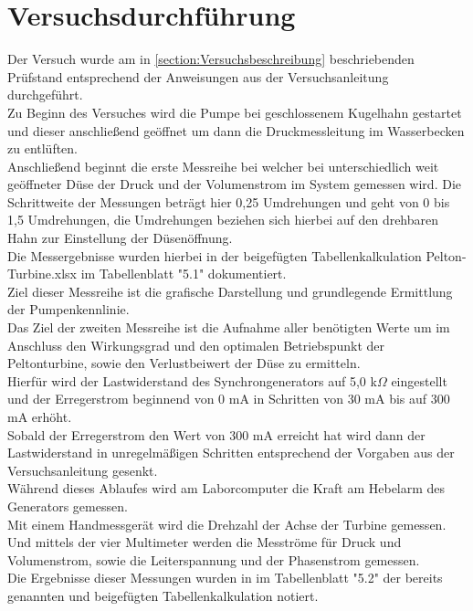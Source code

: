 \section{Versuchsdurchführung}
Der Versuch wurde am in \autoref{section:Versuchsbeschreibung} beschriebenden Prüfstand entsprechend der Anweisungen aus der Versuchsanleitung \cite[S.11-14]{Anleitung} durchgeführt.\\
Zu Beginn des Versuches wird die Pumpe bei geschlossenem Kugelhahn gestartet und dieser anschließend geöffnet um dann die Druckmessleitung im Wasserbecken zu entlüften.\\
Anschließend beginnt die erste Messreihe bei welcher bei unterschiedlich weit geöffneter Düse der Druck und der Volumenstrom im System gemessen wird.
Die Schrittweite der Messungen beträgt hier 0,25 Umdrehungen und geht von 0 bis 1,5 Umdrehungen, die Umdrehungen beziehen sich hierbei auf den drehbaren Hahn zur Einstellung der Düsenöffnung.\\
Die Messergebnisse wurden hierbei in der beigefügten Tabellenkalkulation Pelton-Turbine.xlsx im Tabellenblatt "5.1" dokumentiert.\\
Ziel dieser Messreihe ist die grafische Darstellung und grundlegende Ermittlung der Pumpenkennlinie.\\
\newline
Das Ziel der zweiten Messreihe ist die Aufnahme aller benötigten Werte um im Anschluss den Wirkungsgrad und den optimalen Betriebspunkt der Peltonturbine,
 sowie den Verlustbeiwert der Düse zu ermitteln.\\
 Hierfür wird der Lastwiderstand des Synchrongenerators auf 5,0 k$\Omega$ eingestellt und der Erregerstrom beginnend von 0 mA in Schritten von 30 mA bis auf 300 mA erhöht.\\
 Sobald der Erregerstrom den Wert von 300 mA erreicht hat wird dann der Lastwiderstand in unregelmäßigen Schritten entsprechend der Vorgaben aus der Versuchsanleitung \cite[S.12]{Anleitung} gesenkt.\\
 Während dieses Ablaufes wird am Laborcomputer die Kraft am Hebelarm des Generators gemessen.\\
 Mit einem Handmessgerät wird die Drehzahl der Achse der Turbine gemessen.\\
 Und mittels der vier Multimeter werden die Mesströme für Druck und Volumenstrom, sowie die Leiterspannung und der Phasenstrom gemessen.\\
 Die Ergebnisse dieser Messungen wurden in im Tabellenblatt "5.2" der bereits genannten und beigefügten Tabellenkalkulation notiert.\\
